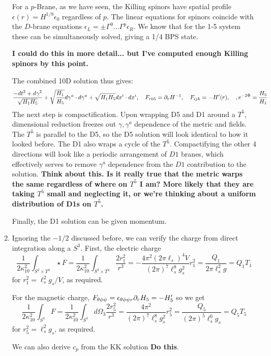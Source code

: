\documentclass[11pt, class=article, crop=false]{standalone}
\begin{document}
\begin{enumerate}
	For a $p$-Brane, as we have seen, the Killing spinors have spatial profile $\epsilon(r) = H^{1/8} \epsilon_0$ regardless of $p$. The linear equations for spinors coincide with the $D$-brane equations $\epsilon_L = \pm \Gamma^0 \dots \Gamma^p \epsilon_R$. We know that for the 1-5 system these can be simultaneously solved, giving a 1/4 BPS state. 
	
	\textbf{I could do this in more detail... but I've computed enough Killing spinors by this point.}
	
	The combined 10D solution thus gives:
	\[
		\frac{-dt^2 + d\gamma^2}{\sqrt{H_1 H_5}} + \sqrt{\frac{H_1}{H_5}} d\gamma^a  \cdot d\gamma^a+ \sqrt{H_1 H_5} dx^i \cdot dx^i, \quad F_{r05} = \partial_r H^{-1}, \quad F_{ijk} = - H'(r), \quad, e^{-2\Phi} = \frac{H_5}{H_1}
	\]
	The next step is compactification. Upon wrapping D5 and D1 around a $T^5$, dimensional reduction freezes out $\gamma, \gamma^a$ dependence of the metric and fields.
	The $T^5$ is parallel to the D5, so the D5 solution will look identical to how it looked before. The D1 also wraps a cycle of the $T^5$. Compactifying the other 4 directions will look like a periodic arrangement of $D1$ branes, which effectively serves to remove $\gamma^a$ dependence from the $D1$ contribution to the solution. \textbf{Think about this. Is it really true that the metric warps the same regardless of where on $T^5$ I am? More likely that they are taking $T^5$ small and neglecting it, or we're thinking about a uniform distribution of D1s on $T^5$.}
	
	Finally, the D1 solution can be given momentum. 
	
	\item 
	Ignoring the $-1/2$ discussed before, we can verify the charge from direct integration along a $S^3$. First, the electric charge 
	\[
		\frac{1}{2 \kappa_{10}^2} \int_{S^3 \times T^4} \star F = \frac{1}{2 \kappa_{10}^2} \int_{S^3 \times T^4} \frac{2 r_1^2}{r^3} = -\frac{4\pi^2 (2\pi \ell_s)^4 V}{(2\pi)^7 \ell_s^8 g_s^2} r_1^2 = \frac{Q_1}{2\pi \ell_s^2 g} = Q_1 T_1
	\]
	for $r_1^2 = \ell_s^2 g_s/V$, as required. 
	
	For the magnetic charge, $F_{\theta \phi \psi} = \epsilon_{\theta \phi \psi r} \partial_r H_5 = -H_5'$ so we get
	\[
		\frac{1}{2 \kappa_{10}^2} \int_{S^3} F = \frac{1}{2 \kappa_{10}^2} \int_{S^3} d\Omega_3 \frac{2 r_5^2}{r^3} = \frac{4 \pi^2}{(2\pi)^7 \ell_s^8 g_s^2} r_5^2 = \frac{Q_5}{(2\pi)^5 \ell_s^6 g_s} = Q_5 T_5
	\]
	for $r_5^2= \ell_s^2 g_s$, as required.
	
	We can also derive $c_p$ from the KK solution \textbf{Do this}.
	

\end{enumerate}
\end{document}
